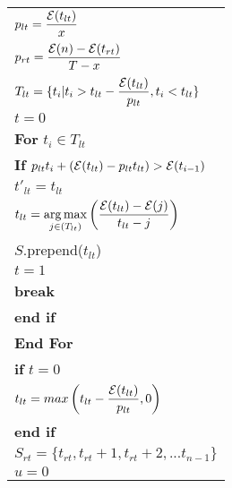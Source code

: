 \begin{table}
\begin{minipage}[b]{8cm}
\begin{tabular}{p{7cm}}
\\
\hspace{4mm}$p_{lt} = \dfrac{\mathcal{E}(t_{lt})}{x}$
\\
\hspace{4mm}$p_{rt} = \dfrac{\mathcal{E}(n)-\mathcal{E}(t_{rt})}{T-x}$
\\
\hspace{4mm}$T_{lt} = \{t_i | t_i > t_{lt} - \dfrac{\mathcal{E}(t_{lt})}{p_{lt}}, t_i < t_{lt}   \}$
\\
\hspace{4mm}$t=0$
\\
\hspace{4mm}\textbf{For} $t_i \in T_{lt}$
\\
\hspace{7mm}\textbf{If} $p_{lt}t_i + (\mathcal{E}(t_{lt}) - p_{lt}t_{lt}) > \mathcal{E}(t_{i-1})$
\\
\hspace{10mm}$t'_{lt} = t_{lt}$
\\
\hspace{10mm}$t_{lt} = \displaystyle \operatorname*{arg\,max}_{j\in(T_{lt})}\left(\dfrac{\mathcal{E}(t_{lt}) - \mathcal{E}(j)}{t_{lt}-j}\right)$
\\
\hspace{10mm}$S$.prepend($t_{lt}$)
\\
\hspace{10mm}$t=1$
\\
\hspace{10mm}\textbf{break}
\\
\hspace{7mm}\textbf{end if}
\\
\hspace{4mm}\textbf{End For}
\\
\hspace{4mm}\textbf{if} $t=0$
\\
\hspace{7mm}$t_{lt} = max\left(t_{lt} - \dfrac{\mathcal{E}(t_{lt})}{p_{lt}} , 0\right)$
\\
\hspace{4mm}\textbf{end if}
\\
\hspace{4mm}$S_{rt} = \{t_{rt},t_{rt}+1,t_{rt}+2,...t_{n-1}\}$
\\
\hspace{4mm}$u=0$

\end{tabular}
\end{minipage}
\end{table}
